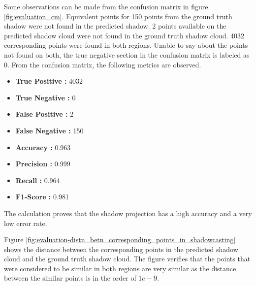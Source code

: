 Some observations can be made from the confusion matrix in figure \ref{fig:evaluation_cm}. Equivalent points for 150 points from the ground truth shadow were not found in the predicted shadow. 2 points available on the predicted shadow cloud were not found in the ground truth shadow cloud. 4032 corresponding points were found in both regions. Unable to say about the points not found on both, the true negative section in the confusion matrix is labeled as 0. From the confusion matrix, the following metrics are observed. 
\begin{itemize}
    \item \textbf{True Positive : }4032
    \item \textbf{True Negative : }0
    \item \textbf{False Positive : }2
    \item \textbf{False Negative : }150
    \item \textbf{Accuracy : }0.963
    \item \textbf{Precision : }0.999
    \item \textbf{Recall : }0.964
    \item \textbf{F1-Score : }0.981
\end{itemize}



The calculation proves that the shadow projection has a high accuracy and a very low error rate. 

Figure \ref{fig:evaluation-distn_betn_corresponding_points_in_shadowcasting} shows the distance between the corresponding points in the predicted shadow cloud and the ground truth shadow cloud. The figure verifies that the points that were considered to be similar in both regions are very similar as the distance between the similar points is in the order of \(1e-9\).


